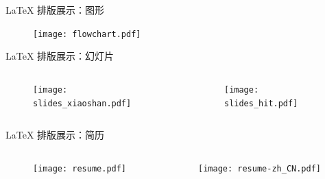\begin{frame}{\LaTeX{} 排版展示：图形}
  \begin{figure}
    \texttt{[image: flowchart.pdf]}
  \end{figure}
\end{frame}

\begin{frame}{\LaTeX{} 排版展示：幻灯片}
  \begin{columns}
    \begin{column}{.5\textwidth}
      \begin{figure}
        \texttt{[image: slides\_xiaoshan.pdf]}
      \end{figure}
    \end{column}
    \begin{column}{.5\textwidth}
      \begin{figure}
        \texttt{[image: slides\_hit.pdf]}
      \end{figure}
    \end{column}
  \end{columns}
\end{frame}

\begin{frame}{\LaTeX{} 排版展示：简历}
  \vspace{1em}
  \begin{columns}
    \begin{column}{.45\textwidth}
      \begin{figure}
        \texttt{[image: resume.pdf]}
      \end{figure}
    \end{column}
    \begin{column}{.45\textwidth}
      \begin{figure}
        \texttt{[image: resume-zh\_CN.pdf]}
      \end{figure}
    \end{column}
  \end{columns}
\end{frame}

